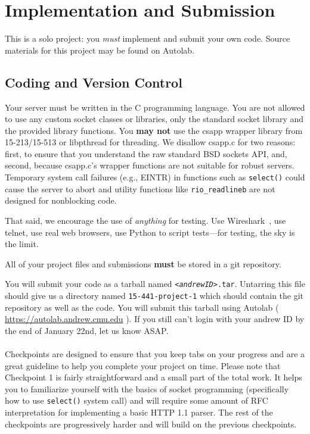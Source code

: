 \section{Implementation and Submission}
This is a solo project: you \emph{must} implement and submit your own code.  
Source materials for this project may be found on Autolab. 

\subsection{Coding and Version Control}
Your server must be written in the C programming language. You are not allowed
to use any custom socket classes or libraries, only the standard socket library
and the provided library functions. You \textbf{may not} use the csapp wrapper
library from 15-213/15-513 or libpthread for threading. We disallow csapp.c for two
reasons:
first, to ensure that you understand the raw standard BSD sockets API,
and, second, because csapp.c's wrapper functions are not suitable for robust
servers. Temporary system call failures (e.g., EINTR) in functions such as
\texttt{select()} could cause the server to abort and utility functions like
\texttt{rio\_readlineb} are not designed for nonblocking code.

That said, we encourage the use of \emph{anything} for testing.  Use
Wireshark~\cite{wireshark}, use telnet, use real web browsers, use Python to
script tests---for testing, the sky is the limit.

All of your project files and submissions \textbf{must} be stored in a git repository.


You will submit your code as a tarball named \texttt{\textit{<andrewID>}.tar}. Untarring this file should give us a directory named \texttt{15-441-project-1} which should contain the git repository as well as the code. You will submit this tarball using Autolab ( \url{https://autolab.andrew.cmu.edu} ). If you still can't login with your andrew ID by the end of January 22nd, let us know ASAP.\\\\
Checkpoints are designed to ensure that you keep tabs on your progress and are a great guideline to help you complete your project on time. Please note that  Checkpoint 1 is fairly straightforward and a small part of the total work. It helps you to familiarize yourself with the basics of socket programming (specifically how to use \texttt{select()} system call) and  will require some amount of RFC interpretation for implementing a basic HTTP 1.1 parser. The rest of the checkpoints are progressively harder and will build on the previous checkpoints.


